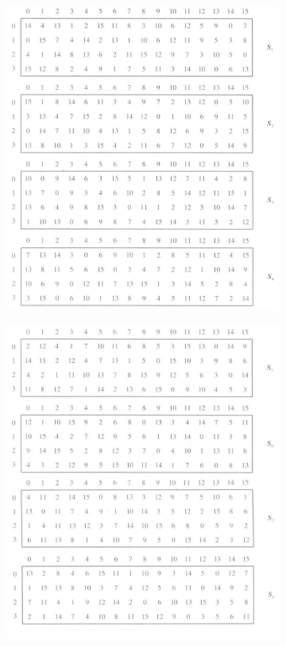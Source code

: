 \documentclass[a4paper,11pt,UTF8]{ctexart}
\begin{document}
            \begin{figure}[H]
                \centering 
                \begin{subfigure}[b]{0.4\textwidth}
                    \includegraphics[width=\textwidth]{S_1.jpg}
                    \label{fig:subfig1}
                \end{subfigure}
                \hfill
                \begin{subfigure}[b]{0.4\textwidth}
                    \includegraphics[width=\textwidth]{S_2.jpg}

\end{subfigure}
\end{figure}
\end{document}
